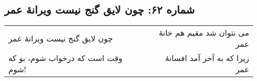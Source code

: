 \begin{center}
\section*{شماره ۶۲: چون لایق گنج نیست ویرانۀ عمر}
\label{sec:062}
\begin{longtable}{l p{0.5cm} r}
چون لایق گنج نیست ویرانهٔ عمر
&&
می نتوان شد مقیم هم خانهٔ عمر
\\
وقت است که درخواب شوم، بو که شوم!
&&
زیرا که به آخر آمد افسانهٔ عمر
\\
\end{longtable}
\end{center}
